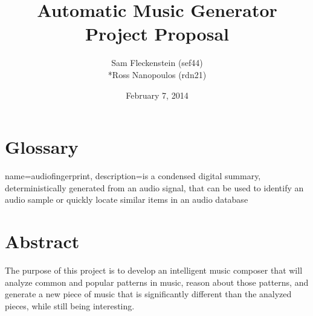 \documentclass{article}
\begin{document}
\clearpage
{}
\begin{center}
\begin{minipage}{.6\textwidth}

\title{Automatic Music Generator \\ \vspace{2 pt} \Large{Project Proposal}}
\author{Sam Fleckenstein (sef44)\\*Ross Nanopoulos (rdn21)}
\date{February 7, 2014}
\maketitle

\end{minipage}
\end{center}
\clearpage

\tableofcontents
\newpage

\section{Glossary}
\printglossary
{}
{
    name=audiofingerprint,
    description={is a condensed digital summary, deterministically generated from an audio signal, that can be used to identify an audio sample or quickly locate similar items in an audio database}
}
\newpage

\section{Abstract}
The purpose of this project is to develop an intelligent music composer that will analyze common and popular patterns in music, reason about those patterns, and generate a new piece of music that is significantly different than the analyzed pieces, while still being interesting.
\end{document}
